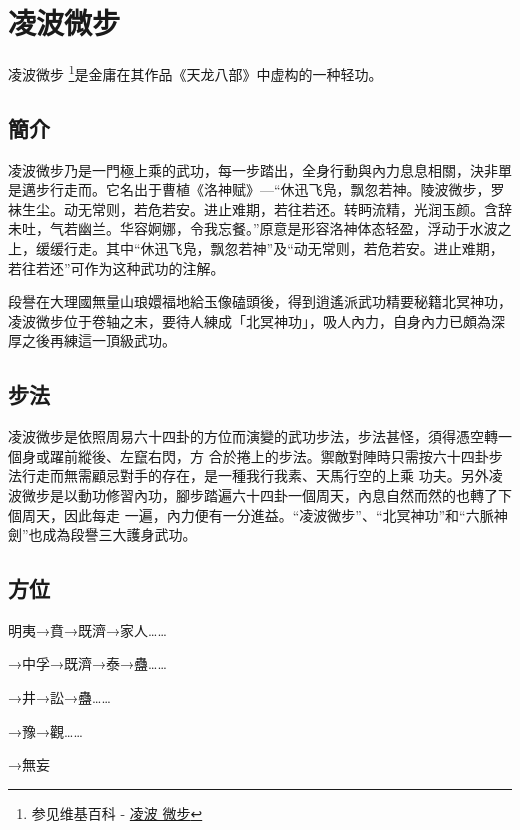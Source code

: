 \chapter{凌波微步}
凌波微步
\footnote{参见维基百科 - \href{http://zh.wikipedia.org/wiki/\%E5\%87\%8C\%E6\%B3\%A2\%E5\%BE\%AE\%E6\%AD\%A5}{凌波
    微步}}是金庸在其作品《天龙八部》中虚构的一种轻功。

\section{簡介}
凌波微步乃是一門極上乘的武功，每一步踏出，全身行動與內力息息相關，決非單是邁步行走而。它名出于曹植《洛神赋》—“休迅飞凫，飘忽若神。陵波微步，罗袜生尘。动无常则，若危若安。进止难期，若往若还。转眄流精，光润玉颜。含辞未吐，气若幽兰。华容婀娜，令我忘餐。”原意是形容洛神体态轻盈，浮动于水波之上，缓缓行走。其中“休迅飞凫，飘忽若神”及“动无常则，若危若安。进止难期，若往若还”可作为这种武功的注解。

段譽在大理國無量山琅嬛福地給玉像磕頭後，得到逍遙派武功精要秘籍北冥神功，凌波微步位于卷轴之末，要待人練成「北冥神功」，吸人內力，自身內力已頗為深厚之後再練這一頂級武功。
\section{步法}
凌波微步是依照周易六十四卦的方位而演變的武功步法，步法甚怪，須得憑空轉一個身或躍前縱後、左竄右閃，方
合於捲上的步法。禦敵對陣時只需按六十四卦步法行走而無需顧忌對手的存在，是一種我行我素、天馬行空的上乘
功夫。另外凌波微步是以動功修習內功，腳步踏遍六十四卦一個周天，內息自然而然的也轉了下個周天，因此每走
一遍，內力便有一分進益。“凌波微步”、“北冥神功”和“六脈神劍”也成為段譽三大護身武功。

\section{方位}

明夷→賁→既濟→家人……\par
→中孚→既濟→泰→蠱……\par
→井→訟→蠱……\par
→豫→觀……\par
→無妄

